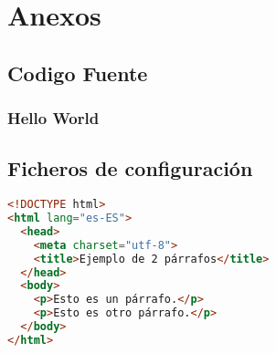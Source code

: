 \chapter{Anexos}

\section{Codigo Fuente}

\subsection{Hello World}
% 

\section{Ficheros de configuración}

\begin{lstlisting}[language=html, label={lst:simple_html_web},caption={Web sencilla realizada en HTML puro}]
<!DOCTYPE html>
<html lang="es-ES">
  <head>
    <meta charset="utf-8">
    <title>Ejemplo de 2 párrafos</title>
  </head>
  <body>
    <p>Esto es un párrafo.</p>
    <p>Esto es otro párrafo.</p>
  </body>
</html>
\end{lstlisting}

